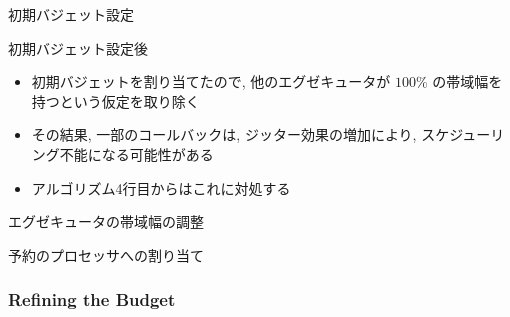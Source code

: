 \begin{frame}{初期バジェット設定}
\end{frame}

\begin{frame}{初期バジェット設定後}
    \begin{itemize}
        \item 初期バジェットを割り当てたので, 他のエグゼキュータが $100 \%$ の帯域幅を持つという仮定を取り除く
        \item その結果, 一部のコールバックは, ジッター効果の増加により, スケジューリング不能になる可能性がある
        \item アルゴリズム4行目からはこれに対処する
    \end{itemize}
\end{frame}

\begin{frame}{エグゼキュータの帯域幅の調整}
\end{frame}

\begin{frame}{予約のプロセッサへの割り当て}
\end{frame}


\subsubsection{Refining the Budget}
\label{sssec: refining the budget}

